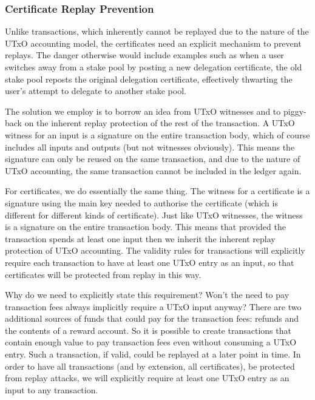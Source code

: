 \documentclass[11pt,a4paper,dvipsnames,twosided]{article}
\begin{document}
\subsubsection{Certificate Replay Prevention}
\label{certificate-replay-prevention}

Unlike transactions, which inherently cannot be replayed due to the nature of
the UTxO accounting model, the certificates need an explicit mechanism to
prevent replays. The danger otherwise would include examples such as when a user
switches away from a stake pool by posting a new delegation certificate, the old
stake pool reposts the original delegation certificate, effectively thwarting
the user's attempt to delegate to another stake pool.

The solution we employ is to borrow an idea from UTxO witnesses and to
piggy-back on the inherent replay protection of the rest of the
transaction. A UTxO witness for an input is a signature on the entire
transaction body, which of course includes all inputs and outputs (but
not witnesses obviously). This means the signature can only be reused
on the same transaction, and due to the nature of UTxO accounting, the
same transaction cannot be included in the ledger again.

For certificates, we do essentially the same thing. The witness for a
certificate is a signature using the main key needed to authorise the
certificate (which is different for different kinds of certificate).
Just like UTxO witnesses, the witness is a signature on the entire
transaction body. This means that provided the transaction spends at
least one input then we inherit the inherent replay protection of UTxO
accounting. The validity rules for transactions will explicitly require each
transaction to have at least one UTxO entry as an input, so that certificates
will be protected from replay in this way.

Why do we need to explicitly state this requirement? Won't the need to pay
transaction fees always implicitly require a UTxO input anyway? There are two
additional sources of funds that could pay for the transaction fees: refunds and
the contents of a reward account. So it is possible to create transactions that
contain enough value to pay transaction fees even without consuming a UTxO
entry. Such a transaction, if valid, could be replayed at a later point in time.
In order to have all transactions (and by extension, all certificates), be
protected from replay attacks, we will explicitly require at least one UTxO
entry as an input to any transaction.
\end{document}
